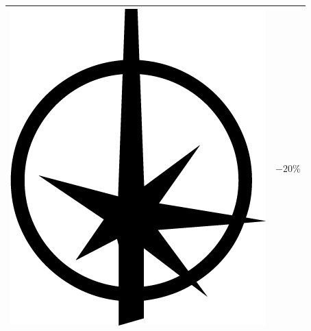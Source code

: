 \documentclass{article}
\begin{document}
\begin{multicols}{2}
\begin{tabular}[b]{|p{5cm}|p{1cm}|}
		\hline 
		{\Large \includegraphics[height=\fontcharht\font`\B]{../img/result_triomphe_triumph}} & $-20\%$ \\ 
		\hline 

\end{tabular}
\end{multicols}
\end{document}
